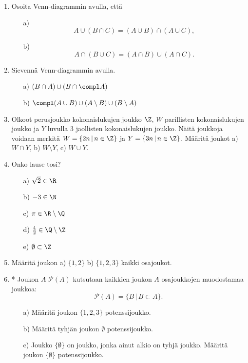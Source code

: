 \begin{enumerate}
\item Osoita Venn-diagrammin avulla, että
\begin{itemize}
\item[a)] 
\[
A\cup (B \cap C) = (A\cup B)\cap(A\cup C),
\]
\item[b)] 
\[
A\cap (B \cup C) = (A\cap B)\cup(A\cap C).
\]
\end{itemize}

\item Sievennä Venn-diagrammin avulla.
\begin{itemize}
\item[a)] $(B\cap A) \cup (B \cap \compl A)$
\item[b)] $\compl (A\cup B) \cup (A \setminus B) \cup (B \setminus A)$
\end{itemize}

\item
Olkoot perusjoukko kokonaislukujen joukko $\Z$, $W$ parillisten kokonaislukujen joukko ja $Y$ luvulla $3$ jaollisten kokonaislukujen joukko. Näitä joukkoja voidaan merkitä $W = \{2n\,|\, n\in\Z\}$ ja $Y = \{3n \,|\, n \in \Z\}$. Määritä joukot a) $W \cap Y$, b) $W \setminus Y$, c) $W \cup Y$.

\item Onko lause tosi?
\begin{itemize}
\item[a)] $\sqrt{2} \in \R$
\item[b)] $-3 \in \N$
\item[c)] $\pi \in \R \setminus \Q$
\item[d)] $\frac{4}{2} \in \Q \setminus \Z$
\item[e)] $\emptyset \subset \Z$
\end{itemize}

\item Määritä joukon a) $\{1,2\}$ b) $\{1,2,3\}$ kaikki osajoukot.

\item * %
Joukon $A$  $\mathcal{P}(A)$ kutsutaan kaikkien joukon $A$ osajoukkojen muodostamaa joukkoa:
\[
\mathcal{P}(A)=\{ B \, | \, B\subset A\}.
\]
\begin{itemize}
\item[a)] Määritä joukon $\{1,2,3\}$ potenssijoukko.
\item[b)] Määritä tyhjän joukon $\emptyset$ potenssijoukko.
\item[c)] Joukko $\{\emptyset\}$ on joukko, jonka ainut alkio on tyhjä joukko. Määritä joukon $\{\emptyset\}$ potenssijoukko.
\end{itemize}


\end{enumerate}
